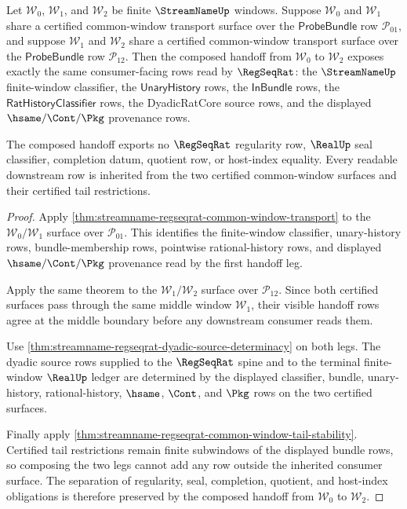 \begin{theorem}
\label{thm:streamname-regseqrat-common-window-composition-handoff}
Let $\mathcal W_0$, $\mathcal W_1$, and $\mathcal W_2$ be finite
$\StreamNameUp$ windows. Suppose $\mathcal W_0$ and $\mathcal W_1$ share a
certified common-window transport surface over the $\mathsf{ProbeBundle}$ row
$\mathcal P_{01}$, and suppose $\mathcal W_1$ and $\mathcal W_2$ share a
certified common-window transport surface over the $\mathsf{ProbeBundle}$ row
$\mathcal P_{12}$. Then the composed handoff from $\mathcal W_0$ to
$\mathcal W_2$ exposes exactly the same consumer-facing rows read by
$\RegSeqRat$: the $\StreamNameUp$ finite-window classifier, the
$\mathsf{UnaryHistory}$ rows, the $\mathsf{InBundle}$ rows, the
$\mathsf{RatHistoryClassifier}$ rows, the DyadicRatCore source rows, and the
displayed $\hsame/\Cont/\Pkg$ provenance rows.

The composed handoff exports no $\RegSeqRat$ regularity row, $\RealUp$ seal
classifier, completion datum, quotient row, or host-index equality. Every
readable downstream row is inherited from the two certified common-window
surfaces and their certified tail restrictions.
\end{theorem}
\begin{proof}
Apply \autoref{thm:streamname-regseqrat-common-window-transport} to the
$\mathcal W_0/\mathcal W_1$ surface over $\mathcal P_{01}$. This identifies the
finite-window classifier, unary-history rows, bundle-membership rows,
pointwise rational-history rows, and displayed $\hsame/\Cont/\Pkg$ provenance
read by the first handoff leg.

Apply the same theorem to the $\mathcal W_1/\mathcal W_2$ surface over
$\mathcal P_{12}$. Since both certified surfaces pass through the same middle
window $\mathcal W_1$, their visible handoff rows agree at the middle boundary
before any downstream consumer reads them.

Use \autoref{thm:streamname-regseqrat-dyadic-source-determinacy} on both legs.
The dyadic source rows supplied to the $\RegSeqRat$ spine and to the terminal
finite-window $\RealUp$ ledger are determined by the displayed classifier,
bundle, unary-history, rational-history, $\hsame$, $\Cont$, and $\Pkg$ rows on
the two certified surfaces.

Finally apply \autoref{thm:streamname-regseqrat-common-window-tail-stability}.
Certified tail restrictions remain finite subwindows of the displayed bundle
rows, so composing the two legs cannot add any row outside the inherited
consumer surface. The separation of regularity, seal, completion, quotient,
and host-index obligations is therefore preserved by the composed handoff from
$\mathcal W_0$ to $\mathcal W_2$.
\end{proof}


